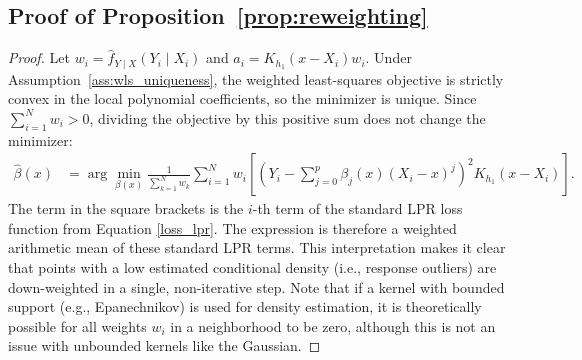 \documentclass[preprint,1p,times,authoryear]{elsarticle}
\begin{document}
\subsection{Proof of Proposition~\ref{prop:reweighting}}
\label{appendix:proof_reweighting}
\begin{proof}
Let $w_i = \hat f_{Y\mid X}(Y_i\mid X_i)$ and \(a_i=K_{h_1}(x-X_i)w_i\). Under Assumption~\ref{ass:wls_uniqueness}, the weighted least-squares objective is strictly convex in the local polynomial coefficients, so the minimizer is unique. Since \(\sum_{i=1}^N w_i>0\), dividing the objective by this positive sum does not change the minimizer:
\begin{align}
\hat{\beta}(x) &= \arg\min_{\beta(x)} \frac{1}{\sum_{k=1}^N w_k} \sum_{i=1}^N w_i \left[ \left(Y_i-\sum_{j=0}^{p}\beta_j(x)(X_i - x)^j\right)^2 K_{h_1}(x-X_i) \right].
\end{align}
The term in the square brackets is the $i$-th term of the standard LPR loss function from Equation \eqref{loss_lpr}. The expression is therefore a weighted arithmetic mean of these standard LPR terms. This interpretation makes it clear that points with a low estimated conditional density (i.e., response outliers) are down-weighted in a single, non-iterative step. Note that if a kernel with bounded support (e.g., Epanechnikov) is used for density estimation, it is theoretically possible for all weights $w_i$ in a neighborhood to be zero, although this is not an issue with unbounded kernels like the Gaussian.
\end{proof}
\end{document}
